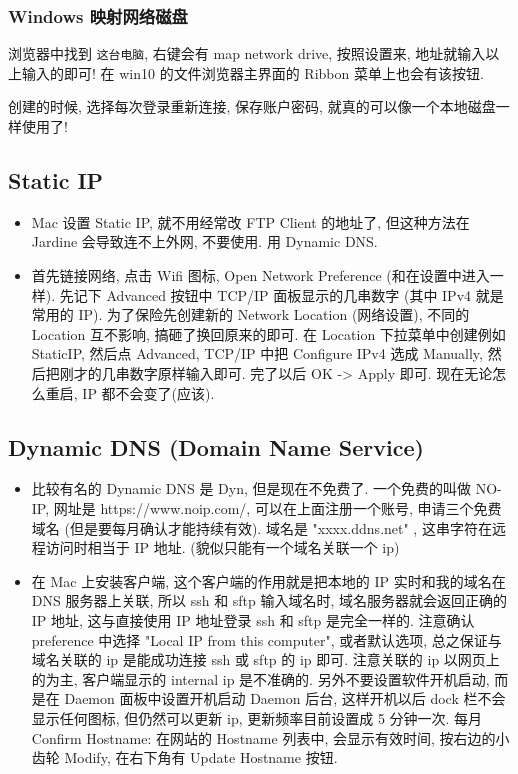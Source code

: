 \subsubsection{Windows 映射网络磁盘}
浏览器中找到 \verb|这台电脑|, 右键会有 map network drive, 按照设置来, 地址就输入以上输入的即可! 在 win10 的文件浏览器主界面的 Ribbon 菜单上也会有该按钮.

创建的时候, 选择每次登录重新连接, 保存账户密码, 就真的可以像一个本地磁盘一样使用了!

\subsection{Static IP}
\begin{itemize}
\item Mac 设置 Static IP, 就不用经常改 FTP Client 的地址了, 但这种方法在 Jardine 会导致连不上外网, 不要使用. 用 Dynamic DNS.
\item 首先链接网络, 点击 Wifi 图标, Open Network Preference (和在设置中进入一样). 先记下 Advanced 按钮中 TCP/IP 面板显示的几串数字 (其中 IPv4 就是常用的 IP). 为了保险先创建新的 Network Location (网络设置), 不同的 Location 互不影响, 搞砸了换回原来的即可. 在 Location 下拉菜单中创建例如 StaticIP, 然后点 Advanced, TCP/IP 中把 Configure IPv4 选成 Manually, 然后把刚才的几串数字原样输入即可. 完了以后 OK -> Apply 即可. 现在无论怎么重启, IP 都不会变了(应该).
\end{itemize}

\subsection{Dynamic DNS (Domain Name Service)}
\begin{itemize}
\item 比较有名的 Dynamic DNS 是 Dyn, 但是现在不免费了. 一个免费的叫做 NO-IP, 网址是 https://www.noip.com/, 可以在上面注册一个账号, 申请三个免费域名 (但是要每月确认才能持续有效).  域名是 "xxxx.ddns.net"  , 这串字符在远程访问时相当于 IP 地址. (貌似只能有一个域名关联一个 ip)

\item 在 Mac 上安装客户端, 这个客户端的作用就是把本地的 IP 实时和我的域名在 DNS 服务器上关联, 所以 ssh 和 sftp 输入域名时, 域名服务器就会返回正确的 IP 地址, 这与直接使用 IP 地址登录 ssh 和 sftp 是完全一样的.
注意确认 preference 中选择 "Local IP from this computer", 或者默认选项, 总之保证与域名关联的 ip 是能成功连接 ssh 或 sftp 的 ip 即可. 注意关联的 ip 以网页上的为主, 客户端显示的 internal ip 是不准确的.
另外不要设置软件开机启动, 而是在 Daemon 面板中设置开机启动 Daemon 后台, 这样开机以后 dock 栏不会显示任何图标, 但仍然可以更新 ip, 更新频率目前设置成 5 分钟一次.
每月 Confirm Hostname: 在网站的 Hostname 列表中, 会显示有效时间, 按右边的小齿轮 Modify, 在右下角有 Update Hostname 按钮.
\end{itemize}
